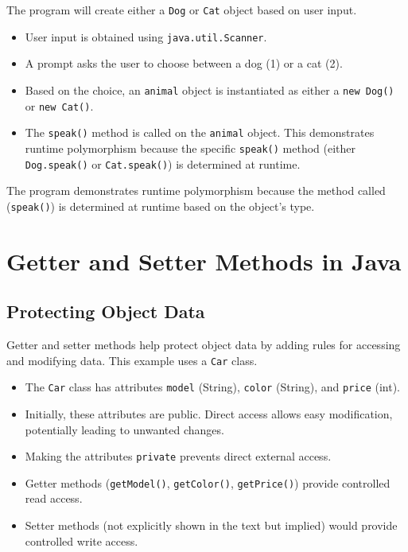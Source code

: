 \documentclass{article}
\begin{document}
The program will create either a \texttt{Dog} or \texttt{Cat} object based on user input.

\begin{itemize}
    \item User input is obtained using \texttt{java.util.Scanner}.
    \item A prompt asks the user to choose between a dog (1) or a cat (2).
    \item Based on the choice, an \texttt{animal} object is instantiated as either a \texttt{new Dog()} or \texttt{new Cat()}.
    \item The \texttt{speak()} method is called on the \texttt{animal} object.  This demonstrates runtime polymorphism because the specific \texttt{speak()} method (either \texttt{Dog.speak()} or \texttt{Cat.speak()}) is determined at runtime.
\end{itemize}

The program demonstrates runtime polymorphism because the method called (\texttt{speak()}) is determined at runtime based on the object's type.


\section{Getter and Setter Methods in Java}

\subsection{Protecting Object Data}

Getter and setter methods help protect object data by adding rules for accessing and modifying data.  This example uses a \texttt{Car} class.

\begin{itemize}
    \item The \texttt{Car} class has attributes \texttt{model} (String), \texttt{color} (String), and \texttt{price} (int).
    \item Initially, these attributes are public.  Direct access allows easy modification, potentially leading to unwanted changes.
    \item Making the attributes \texttt{private} prevents direct external access.
    \item Getter methods (\texttt{getModel()}, \texttt{getColor()}, \texttt{getPrice()}) provide controlled read access.
    \item Setter methods (not explicitly shown in the text but implied) would provide controlled write access.
\end{itemize}
\end{document}
